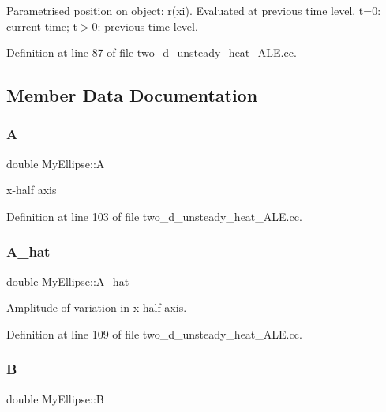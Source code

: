 Parametrised position on object\+: r(xi). Evaluated at previous time level. t=0\+: current time; t$>$0\+: previous time level. 



Definition at line 87 of file two\+\_\+d\+\_\+unsteady\+\_\+heat\+\_\+\+A\+L\+E.\+cc.



\subsection{Member Data Documentation}
\mbox{\label{classMyEllipse_aa2a0efd0a39f9d4fc307a6ff011682ed}} 
\subsubsection{\texorpdfstring{A}{A}}
{\footnotesize\ttfamily double My\+Ellipse\+::A\hspace{0.3cm}{\ttfamily [protected]}}



x-\/half axis 



Definition at line 103 of file two\+\_\+d\+\_\+unsteady\+\_\+heat\+\_\+\+A\+L\+E.\+cc.

\mbox{\label{classMyEllipse_a653e71cf296cdc86cc595d16f18004dd}} 
\subsubsection{\texorpdfstring{A\+\_\+hat}{A\_hat}}
{\footnotesize\ttfamily double My\+Ellipse\+::\+A\+\_\+hat\hspace{0.3cm}{\ttfamily [protected]}}



Amplitude of variation in x-\/half axis. 



Definition at line 109 of file two\+\_\+d\+\_\+unsteady\+\_\+heat\+\_\+\+A\+L\+E.\+cc.

\mbox{\label{classMyEllipse_a8f991996b9040fe94b942eab7e51f0af}} 
\subsubsection{\texorpdfstring{B}{B}}
{\footnotesize\ttfamily double My\+Ellipse\+::B\hspace{0.3cm}{\ttfamily [protected]}}



